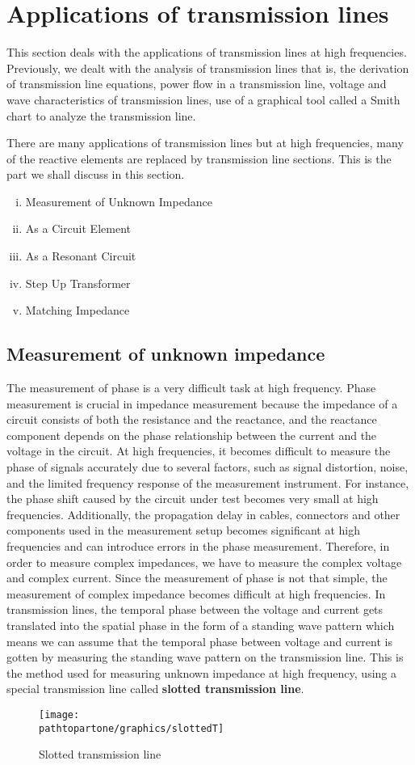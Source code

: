 \section{Applications of transmission lines}\label{lec:lec10}
This section deals with the applications of transmission lines at high frequencies. Previously, we dealt with the
analysis of transmission lines that is, the derivation of transmission line equations, power flow in a transmission line, voltage and wave characteristics of transmission lines, use of a graphical tool called a Smith chart to analyze the transmission line.

There are many applications of transmission lines but at high frequencies, many of the reactive elements are replaced by transmission line sections. This is the part we shall discuss in this section.
\begin{enumerate}[(i)]
\item Measurement of Unknown Impedance 
\item As a Circuit Element
\item As a Resonant Circuit
\item Step Up Transformer 
\item Matching Impedance
\end{enumerate}

\subsection{Measurement of unknown impedance}
The measurement of phase is a very difficult task at high frequency. Phase measurement is crucial in impedance measurement because the impedance of a circuit consists of both the resistance and the reactance, and the reactance component depends on the phase relationship between the current and the voltage in the circuit. At high frequencies, it becomes difficult to measure the phase of signals accurately due to several factors, such as signal distortion, noise, and the limited frequency response of the measurement instrument. For instance, the phase shift caused by the circuit under test becomes very small at high frequencies. Additionally, the propagation delay in cables, connectors and other components used in the measurement setup becomes significant at high frequencies and can introduce errors in the phase measurement. Therefore, in order to measure complex impedances, we have to measure the complex voltage and complex current. Since the measurement of phase is not that simple, the measurement of complex impedance becomes difficult at high frequencies. In transmission lines, the temporal phase between the voltage and current gets translated into the spatial phase in the form of a standing wave pattern which means we can assume that the temporal phase between voltage and current is gotten by measuring the standing wave pattern on the transmission line. This is the method used for measuring unknown impedance at high frequency, using a special transmission line called \textbf{slotted
transmission line}.
\begin{figure}[h]
\centering
\texttt{[image: \\pathtopartone/graphics/slottedT]}
\caption{Slotted transmission line}
\label{fig:slottedT}
\end{figure}

